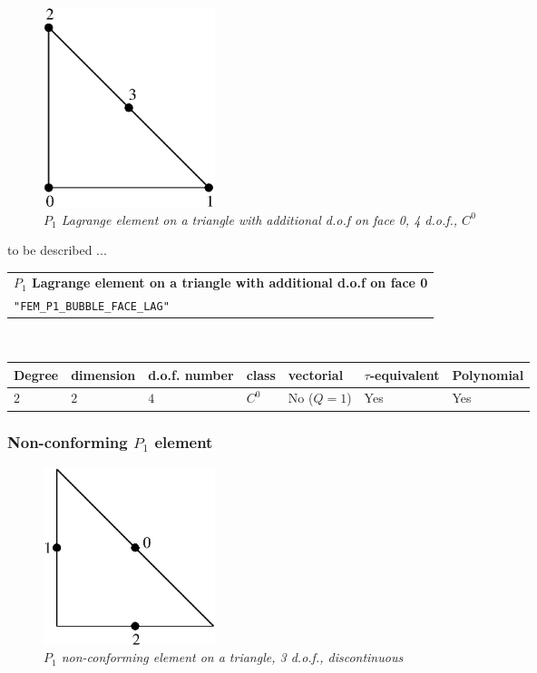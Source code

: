 \documentclass[11pt,a4paper]{article}
\begin{document}
\begin{figure}[H]
  \begin{center}
    \includegraphics[width=5cm,angle=0]{getfemlist_triangle_P1_with_P2_face.eps}
  \end{center}
  \caption{ \it $P_1$ Lagrange element on a triangle with additional d.o.f on face 0, 4 d.o.f., $C^0$} 
  \label{fig:triangle_p1_p2_face}
\end{figure}

to be described ...

\begin{center}
\begin{tabular}{|m{16.11cm}|} \hline 
{ \bf $P_1$ Lagrange element on a triangle with additional d.o.f on face 0}\\
{\tt "FEM\_P1\_BUBBLE\_FACE\_LAG"} 
\end{tabular} \\ \vspace{-1pt} 
\begin{tabular}{|m{2cm}|m{2cm}|m{2.5cm}|m{1.2cm}|m{2cm}|m{2cm}|m{1.8cm}|} \hline 
Degree & dimension & d.o.f. number & class & vectorial & \mbox{$\tau$-equivalent} & Polynomial\\ \hline
$2$ & $2$ & $4$ & $C^0$ & No \mbox{($Q = 1$)} & Yes & Yes\\ \hline
\end{tabular}
\end{center}

\subsubsection{Non-conforming $P_1$ element}


\begin{figure}[H]
  \begin{center}
    \includegraphics[width=5cm,angle=0]{getfemlist_triangle_P1_non_conforming.eps}
  \end{center}
  \caption{ \it $P_1$ non-conforming element on a triangle, 3 d.o.f., discontinuous} 
  \label{fig:triangle_non_conforming}
\end{figure}
\end{document}
